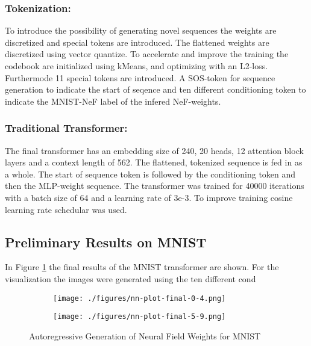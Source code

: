 \subsubsection*{Tokenization: }
To introduce the possibility of generating novel sequences the weights are discretized and special tokens are introduced. The flattened weights are discretized using vector quantize. To accelerate and improve the training the codebook are initialized using kMeans, and optimizing with an L2-loss. Furthermode 11 special tokens are introduced. A SOS-token for sequence generation to indicate the start of seqence and ten different conditioning token to indicate the MNIST-NeF label of the infered NeF-weights.

\subsubsection*{Traditional Transformer: }
The final transformer has an embedding size of 240, 20 heads, 12 attention block layers and a context length of 562. The flattened, tokenized sequence is fed in as a whole. The start of sequence token is followed by the conditioning token and then the MLP-weight sequence. The transformer was trained for 40000 iterations with a batch size of 64 and a learning rate of 3e-3. To improve training cosine learning rate schedular was used.



\subsection{Preliminary Results on MNIST}
In Figure \ref{fig:mnist} the final results of the MNIST transformer are shown. For the visualization the images were generated using the ten different cond

\begin{figure}[H]
  \begin{mdframed}[backgroundcolor=mnistbg]

    \centering
    \begin{subfigure}{.5\linewidth}
      \centering
      \texttt{[image: ./figures/nn-plot-final-0-4.png]}
    \end{subfigure}%
    \begin{subfigure}{.5\linewidth}
      \centering
      \texttt{[image: ./figures/nn-plot-final-5-9.png]}
    \end{subfigure}

  \end{mdframed}
  \caption{\label{fig:mnist} Autoregressive Generation of Neural Field Weights for MNIST}
\end{figure}


